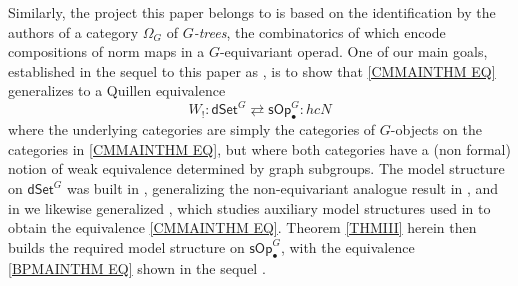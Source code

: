 \documentclass[a4paper,10pt
,draft
]{article}%
\numberwithin{equation}{section}
\numberwithin{figure}{section}
\theoremstyle{definition} %
\newcommand{\1}{\ensuremath{\mathbbm 1}}%
\begin{document}
Similarly, the project this paper belongs to is based on the identification by the authors of a category
$\Omega_G$ of \emph{$G$-trees},
the combinatorics of which encode compositions of norm maps in a $G$-equivariant operad.
%
One of our main goals, established
in the sequel to this paper as \cite[Thm. I]{BP_TAS},
is to show that 
\eqref{CMMAINTHM EQ}
generalizes to a Quillen equivalence 
\begin{equation}\label{BPMAINTHM EQ}
W_!\colon 
\mathsf{dSet}^G \rightleftarrows \mathsf{sOp}_{\bullet}^G
\colon hcN
\end{equation}
where the underlying categories are simply the categories 
of $G$-objects on the categories in 
\eqref{CMMAINTHM EQ},
but where both categories have a (non formal) notion of weak equivalence determined by graph subgroups.
The model structure on $\mathsf{dSet}^G$
was built in \cite{Per18},
generalizing the non-equivariant analogue result in \cite{BM11},
and in \cite{BP_edss} we likewise generalized \cite{CM13a},
which studies auxiliary model structures 
used in \cite{CM13b} to obtain the equivalence 
\eqref{CMMAINTHM EQ}.
Theorem \ref{THMIII} herein then builds 
the required model structure on 
$\mathsf{sOp}_{\bullet}^G$,
with the equivalence \eqref{BPMAINTHM EQ}
shown in the sequel \cite{BP_TAS}.
\end{document}
